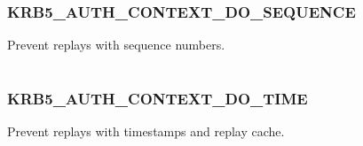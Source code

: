 \documentclass[letterpaper,10pt,english]{sphinxmanual}
\begin{document}
\begin{tabulary}{\linewidth}{|L|L|}
\hline

 & 
\\
\hline\end{tabulary}



\subsubsection{KRB5\_AUTH\_CONTEXT\_DO\_SEQUENCE}
\label{appdev/refs/macros/KRB5_AUTH_CONTEXT_DO_SEQUENCE:krb5-auth-context-do-sequence-data}\label{appdev/refs/macros/KRB5_AUTH_CONTEXT_DO_SEQUENCE:krb5-auth-context-do-sequence}\label{appdev/refs/macros/KRB5_AUTH_CONTEXT_DO_SEQUENCE::doc}

\begin{fulllineitems}
\label{appdev/refs/macros/KRB5_AUTH_CONTEXT_DO_SEQUENCE:KRB5_AUTH_CONTEXT_DO_SEQUENCE}
\end{fulllineitems}


Prevent replays with sequence numbers.

\begin{tabulary}{\linewidth}{|L|L|}
\hline

 & 
\\
\hline\end{tabulary}



\subsubsection{KRB5\_AUTH\_CONTEXT\_DO\_TIME}
\label{appdev/refs/macros/KRB5_AUTH_CONTEXT_DO_TIME:krb5-auth-context-do-time-data}\label{appdev/refs/macros/KRB5_AUTH_CONTEXT_DO_TIME:krb5-auth-context-do-time}\label{appdev/refs/macros/KRB5_AUTH_CONTEXT_DO_TIME::doc}

\begin{fulllineitems}
\label{appdev/refs/macros/KRB5_AUTH_CONTEXT_DO_TIME:KRB5_AUTH_CONTEXT_DO_TIME}
\end{fulllineitems}


Prevent replays with timestamps and replay cache.
\end{document}
